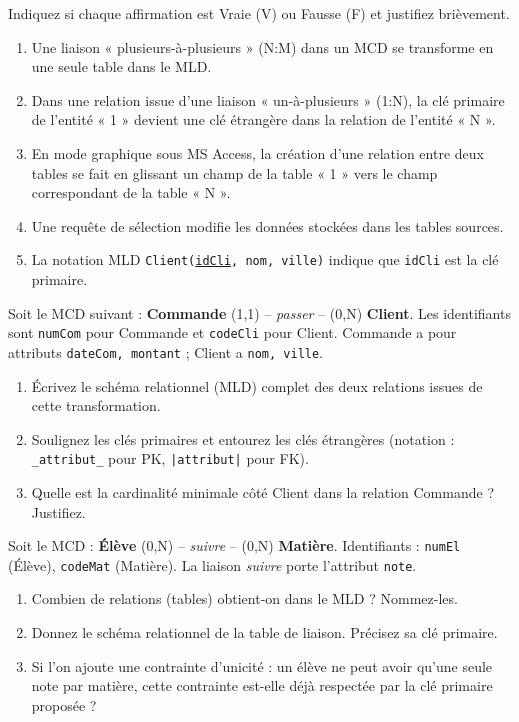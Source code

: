 \documentclass[11pt]{article}
\begin{document}
\begin{exercice}
Indiquez si chaque affirmation est Vraie (V) ou Fausse (F) et justifiez brièvement.
\begin{enumerate}
    \item Une liaison « plusieurs-à-plusieurs » (N:M) dans un MCD se transforme en une seule table dans le MLD.
    \item Dans une relation issue d'une liaison « un-à-plusieurs » (1:N), la clé primaire de l'entité « 1 » devient une clé étrangère dans la relation de l'entité « N ».
    \item En mode graphique sous MS Access, la création d'une relation entre deux tables se fait en glissant un champ de la table « 1 » vers le champ correspondant de la table « N ».
    \item Une requête de sélection modifie les données stockées dans les tables sources.
    \item La notation MLD \texttt{Client(\underline{idCli}, nom, ville)} indique que \texttt{idCli} est la clé primaire.
\end{enumerate}
\end{exercice}

\begin{exercice}
Soit le MCD suivant : \textbf{Commande} (1,1) -- \textit{passer} -- (0,N) \textbf{Client}.
Les identifiants sont \texttt{numCom} pour Commande et \texttt{codeCli} pour Client. Commande a pour attributs \texttt{dateCom, montant} ; Client a \texttt{nom, ville}.
\begin{enumerate}
    \item Écrivez le schéma relationnel (MLD) complet des deux relations issues de cette transformation.
    \item Soulignez les clés primaires et entourez les clés étrangères (notation : \texttt{\_attribut\_} pour PK, \texttt{|attribut|} pour FK).
    \item Quelle est la cardinalité minimale côté Client dans la relation Commande ? Justifiez.
\end{enumerate}
\end{exercice}

\begin{exercice}
Soit le MCD : \textbf{Élève} (0,N) -- \textit{suivre} -- (0,N) \textbf{Matière}.
Identifiants : \texttt{numEl} (Élève), \texttt{codeMat} (Matière). La liaison \textit{suivre} porte l'attribut \texttt{note}.
\begin{enumerate}
    \item Combien de relations (tables) obtient-on dans le MLD ? Nommez-les.
    \item Donnez le schéma relationnel de la table de liaison. Précisez sa clé primaire.
    \item Si l'on ajoute une contrainte d'unicité : un élève ne peut avoir qu'une seule note par matière, cette contrainte est-elle déjà respectée par la clé primaire proposée ?
\end{enumerate}
\end{exercice}
\end{document}

